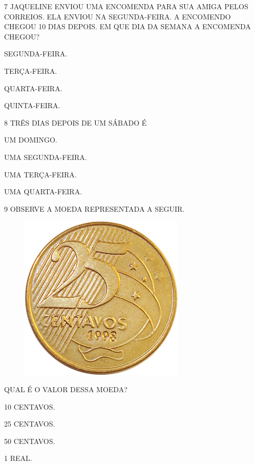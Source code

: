 \num{7} JAQUELINE ENVIOU UMA ENCOMENDA PARA SUA AMIGA PELOS CORREIOS. ELA
ENVIOU NA SEGUNDA-FEIRA. A ENCOMENDO CHEGOU 10 DIAS DEPOIS. EM QUE DIA
DA SEMANA A ENCOMENDA CHEGOU?

\begin{escolha}[itemsep=0pt]
\item SEGUNDA-FEIRA.

\item TERÇA-FEIRA.

\item QUARTA-FEIRA.

\item QUINTA-FEIRA.
\end{escolha}

\num{8} TRÊS DIAS DEPOIS DE UM SÁBADO É

\begin{escolha}[itemsep=0pt]
\item UM DOMINGO.

\item UMA SEGUNDA-FEIRA.

\item UMA TERÇA-FEIRA.

\item UMA QUARTA-FEIRA.
\end{escolha}

\num{9} OBSERVE A MOEDA REPRESENTADA A SEGUIR.

\begin{figure}[htpb!]
\centering
\includegraphics[width=.2\textwidth]{./media/SAEB_1ANO_MAT_FIGURA132.png}
\end{figure}

QUAL É O VALOR DESSA MOEDA?

\begin{escolha}[itemsep=0pt]
\item 10 CENTAVOS.

\item 25 CENTAVOS.

\item 50 CENTAVOS.

\item 1 REAL.
\end{escolha}

\pagebreak

